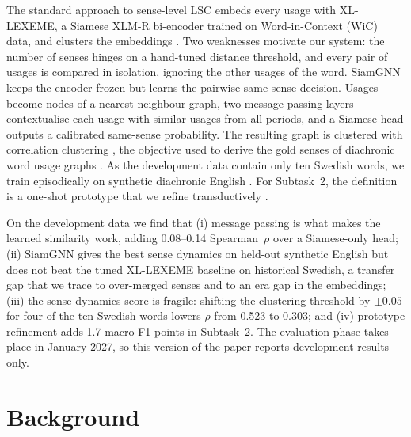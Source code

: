 \documentclass[11pt]{article}
\newcommand{\sys}{SiamGNN\xspace}
\newcommand{\xll}{XL-LEXEME\xspace}
\begin{document}
The standard approach to sense-level LSC embeds every usage with \xll \citep{cassotti2023xllexeme}, a Siamese XLM-R bi-encoder trained on Word-in-Context (WiC) data, and clusters the embeddings \citep{periti2024systematic,periti2024towards}. Two weaknesses motivate our system: the number of senses hinges on a hand-tuned distance threshold, and every pair of usages is compared in isolation, ignoring the other usages of the word. \sys keeps the encoder frozen but learns the pairwise same-sense decision. Usages become nodes of a nearest-neighbour graph, two message-passing layers \citep{kipf2017semi,hamilton2017inductive} contextualise each usage with similar usages from all periods, and a Siamese head \citep{koch2015siamese} outputs a calibrated same-sense probability. The resulting graph is clustered with correlation clustering \citep{bansal2004correlation}, the objective used to derive the gold senses of diachronic word usage graphs \citep{schlechtweg2021dwug}. As the development data contain only ten Swedish words, we train episodically on synthetic diachronic English \citep{saponara2026generating}. For Subtask~2, the definition is a one-shot prototype that we refine transductively \citep{snell2017prototypical}.

On the development data we find that (i) message passing is what makes the learned similarity work, adding 0.08--0.14 Spearman~$\rho$ over a Siamese-only head; (ii) \sys gives the best sense dynamics on held-out synthetic English but does not beat the tuned \xll baseline on historical Swedish, a transfer gap that we trace to over-merged senses and to an era gap in the embeddings; (iii) the sense-dynamics score is fragile: shifting the clustering threshold by $\pm0.05$ for four of the ten Swedish words lowers $\rho$ from 0.523 to 0.303; and (iv) prototype refinement adds 1.7 macro-F1 points in Subtask~2. The evaluation phase takes place in January 2027, so this version of the paper reports development results only.\codefootnote

\section{Background}
\end{document}
